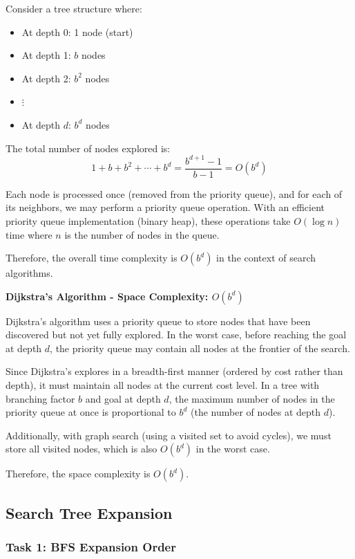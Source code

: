 \documentclass[11pt]{article}
\begin{document}
Consider a tree structure where:
\begin{itemize}
\item At depth 0: 1 node (start)
\item At depth 1: $b$ nodes
\item At depth 2: $b^2$ nodes
\item $\vdots$
\item At depth $d$: $b^d$ nodes
\end{itemize}

The total number of nodes explored is:
$$1 + b + b^2 + \cdots + b^d = \frac{b^{d+1} - 1}{b - 1} = O(b^d)$$

Each node is processed once (removed from the priority queue), and for each of its neighbors, we may perform a priority queue operation. With an efficient priority queue implementation (binary heap), these operations take $O(\log n)$ time where $n$ is the number of nodes in the queue.

Therefore, the overall time complexity is $O(b^d)$ in the context of search algorithms.

\textbf{Dijkstra's Algorithm - Space Complexity: $O(b^d)$}

Dijkstra's algorithm uses a priority queue to store nodes that have been discovered but not yet fully explored. In the worst case, before reaching the goal at depth $d$, the priority queue may contain all nodes at the frontier of the search.

Since Dijkstra's explores in a breadth-first manner (ordered by cost rather than depth), it must maintain all nodes at the current cost level. In a tree with branching factor $b$ and goal at depth $d$, the maximum number of nodes in the priority queue at once is proportional to $b^d$ (the number of nodes at depth $d$).

Additionally, with graph search (using a visited set to avoid cycles), we must store all visited nodes, which is also $O(b^d)$ in the worst case.

Therefore, the space complexity is $O(b^d)$.

\subsection{Search Tree Expansion}

\subsubsection{Task 1: BFS Expansion Order}
\end{document}
